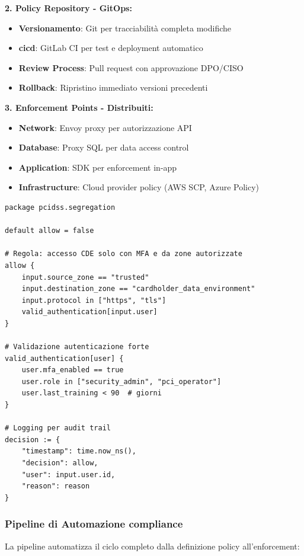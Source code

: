 \textbf{2. Policy Repository - GitOps:}
\begin{itemize}
    \item \textbf{Versionamento}: Git per tracciabilità completa modifiche
    \item \textbf{\gls{cicd}}: GitLab CI per test e deployment automatico
    \item \textbf{Review Process}: Pull request con approvazione DPO/CISO
    \item \textbf{Rollback}: Ripristino immediato versioni precedenti
\end{itemize}

\textbf{3. Enforcement Points - Distribuiti:}
\begin{itemize}
    \item \textbf{Network}: Envoy proxy per autorizzazione API
    \item \textbf{Database}: Proxy SQL per data access control
    \item \textbf{Application}: SDK per enforcement in-app
    \item \textbf{Infrastructure}: Cloud provider policy (AWS SCP, Azure Policy)
\end{itemize}

\begin{lstlisting}[caption={Policy Rego per Segregazione Dati PCI},label={lst:rego_pci}]
package pcidss.segregation

default allow = false

# Regola: accesso CDE solo con MFA e da zone autorizzate
allow {
    input.source_zone == "trusted"
    input.destination_zone == "cardholder_data_environment"
    input.protocol in ["https", "tls"]
    valid_authentication[input.user]
}

# Validazione autenticazione forte
valid_authentication[user] {
    user.mfa_enabled == true
    user.role in ["security_admin", "pci_operator"]
    user.last_training < 90  # giorni
}

# Logging per audit trail
decision := {
    "timestamp": time.now_ns(),
    "decision": allow,
    "user": input.user.id,
    "reason": reason
}
\end{lstlisting}

\subsubsection{Pipeline di Automazione \gls{compliance}}

La pipeline automatizza il ciclo completo dalla definizione policy all'enforcement:

